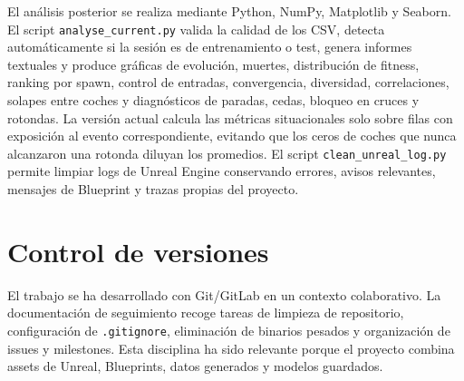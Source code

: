 El análisis posterior se realiza mediante Python, NumPy, Matplotlib y Seaborn. El script \texttt{analyse\_current.py} valida la calidad de los CSV, detecta automáticamente si la sesión es de entrenamiento o test, genera informes textuales y produce gráficas de evolución, muertes, distribución de fitness, ranking por spawn, control de entradas, convergencia, diversidad, correlaciones, solapes entre coches y diagnósticos de paradas, cedas, bloqueo en cruces y rotondas. La versión actual calcula las métricas situacionales solo sobre filas con exposición al evento correspondiente, evitando que los ceros de coches que nunca alcanzaron una rotonda diluyan los promedios. El script \texttt{clean\_unreal\_log.py} permite limpiar logs de Unreal Engine conservando errores, avisos relevantes, mensajes de Blueprint y trazas propias del proyecto.

\section{Control de versiones}

El trabajo se ha desarrollado con Git/GitLab en un contexto colaborativo. La documentación de seguimiento recoge tareas de limpieza de repositorio, configuración de \texttt{.gitignore}, eliminación de binarios pesados y organización de issues y milestones. Esta disciplina ha sido relevante porque el proyecto combina assets de Unreal, Blueprints, datos generados y modelos guardados.
